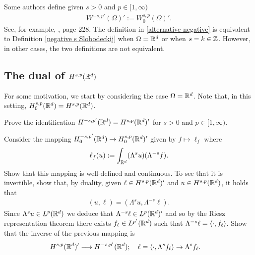 \documentclass[
    a4paper,
    DIV=14,
    abstract=true,
    numbers=noenddot
]{scrartcl}
\begin{document}
\begin{observation}
    Some authors define given $s>0$ and $p \in [1,\infty)$
    \begin{align}\label{alternative negative}
        W^{-s,p'}(\Omega )':=	W^{s,p}_0(\Omega )'.
    \end{align}
    See, for example, \cite{biccari2018local}, \cite{leoni2023first} page 228. The definition in \eqref{alternative negative} is equivalent to Definition \ref{negative s Slobodeckij} when $\Omega = \mathbb{R}^d$ or when $s=k \in \mathbb{Z}$. However, in other cases, the two definitions are not equivalent.
\end{observation}



\subsection{The dual of $H^{s,p}(\mathbb{R}^d)$}
For some motivation, we start by considering the case $\Omega =\mathbb{R}^d$. Note that, in this setting, $H_0^{s,p}(\mathbb{R}^d)=H^{s,p}(\mathbb{R}^d)$.
\begin{exercise}\label{dual exercise}
    Prove the identification $H^{-s,p'}(\mathbb{R}^d)=H^{s,p}(\mathbb{R}^d)'$ for $s>0$ and $p \in [1,\infty)$.
\end{exercise}
\begin{hint}

    Consider the mapping  $H_0^{-s,p'}(\mathbb{R}^d) \to H^{s,p}_0(\mathbb{R}^d)'$ given by $f \mapsto \ell_f$ where
    \begin{align*}
        \ell_f(u):= \int_{\mathbb{R}^d}(\Lambda^s u)(\Lambda ^{-s}f).
    \end{align*}
    Show that this mapping is well-defined and continuous. To see that it is invertible, show that, by duality, given $\ell \in H^{s,p}(\mathbb{R}^d)'$ and $u \in H^{s,p}(\mathbb{R}^d)$, it holds that
    \begin{align*}
        (u,\ell )=(\Lambda ^s u,\Lambda ^{-s}\ell ).
    \end{align*}
    Since $ \Lambda ^s u \in L^p(\mathbb{R}^d)$ we deduce that $\Lambda ^{-s}\ell \in L^{p}(\mathbb{R}^d)'$ and so by the Riesz representation theorem there exists $f_\ell \in L^{p'}(\mathbb{R}^d)$ such that $\Lambda ^{-s}\ell =\left\langle\cdot,f_\ell\right\rangle$. Show that the inverse of the previous mapping is
    \begin{align*}
        H^{s,p}(\mathbb{R}^d)'                & \longrightarrow H^{-s,p'}(\mathbb{R}^d); \quad \ell = \left\langle\cdot, \Lambda^s  f_\ell\right\rangle \to \Lambda^s  f_\ell.\end{align*}
\end{hint}
\end{document}
